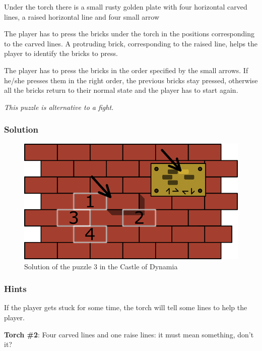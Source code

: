 

Under the torch there is a small rusty golden plate with four horizontal carved lines, a raised horizontal line and four small arrow

The player has to press the bricks under the torch in the positions corresponding to the carved lines. A protruding brick, corresponding to the raised line, helps the player to identify the bricks to press.

The player has to press the bricks in the order specified by the small arrows. If he/she presses them in the right order, the previous bricks stay pressed, otherwise all the bricks return to their normal state and the player has to start again.

\textit{This puzzle is alternative to a fight.}

\subsubsection*{Solution}
\begin{figure}[H]
  \centering
  \includegraphics[width=\textwidth]{Images/Puzzles/castleOfDynamia3Solution}
  \caption{Solution of the puzzle 3 in the Castle of Dynamia}
\end{figure}

\subsubsection*{Hints}
If the player gets stuck for some time, the torch will tell some lines to help the player.

\textbf{Torch \#{}2}: Four carved lines and one raise lines: it must mean something, don't it?


